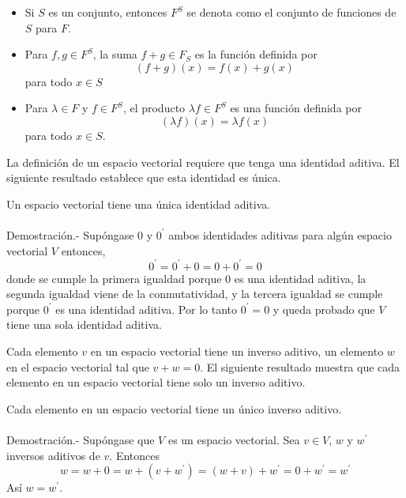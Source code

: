 \begin{tcolorbox}[colback=white]
    \begin{def.}[\boldmath $F^S$]\hfill
	\begin{itemize}
	    \item Si $S$ es un conjunto, entonces $F^S$ se denota como el conjunto de funciones de $S$ para $F$.
	    \item Para $f,g\in F^S$, la suma $f+g\in F_S$ es la función definida por $$(f+g)(x)=f(x)+g(x)$$ para todo $x\in S$
	    \item Para $\lambda \in F$ y $f\in F^S$, el producto $\lambda f \in F^S$ es una función definida por $$(\lambda f)(x)=\lambda f(x)$$
		para todo $x\in S$.
	\end{itemize}
    \end{def.}
\end{tcolorbox}

La definición de un espacio vectorial requiere que tenga una identidad aditiva. El siguiente resultado establece que esta identidad es única.

\begin{teo}
    Un espacio vectorial tiene una única identidad aditiva.\\\\
	Demostración.-\; Supóngase $0$ y $0^{'}$ ambos identidades aditivas para algún espacio vectorial $V$ entonces,
	$$0^{'}=0^{'}+0=0+0^{'}=0$$
	donde se cumple la primera igualdad porque $0$ es una identidad aditiva, la segunda igualdad viene de la conmutatividad, y la tercera igualdad se cumple porque $0^{'}$ es una identidad aditiva. Por lo tanto $0^{'}=0$ y queda probado que $V$ tiene una sola identidad aditiva.\\
\end{teo}

Cada elemento $v$ en un espacio vectorial tiene un inverso aditivo, un elemento $w$ en el espacio vectorial tal que $v + w = 0$. El siguiente resultado muestra que cada elemento en un espacio vectorial tiene solo un inverso aditivo. \\

\begin{teo}
    Cada elemento en un espacio vectorial tiene un único inverso aditivo.\\\\
	Demostración.-\; Supóngase que $V$ es un espacio vectorial. Sea $v\in V$,  $w$ y $w^{'}$ inversos aditivos de $v$. Entonces
	$$w=w+0=w+(v+w^{'}) = (w+v)+w^{'}=0+w^{'}=w^{'}$$
	Así $w=w^{'}$.\\
\end{teo}

